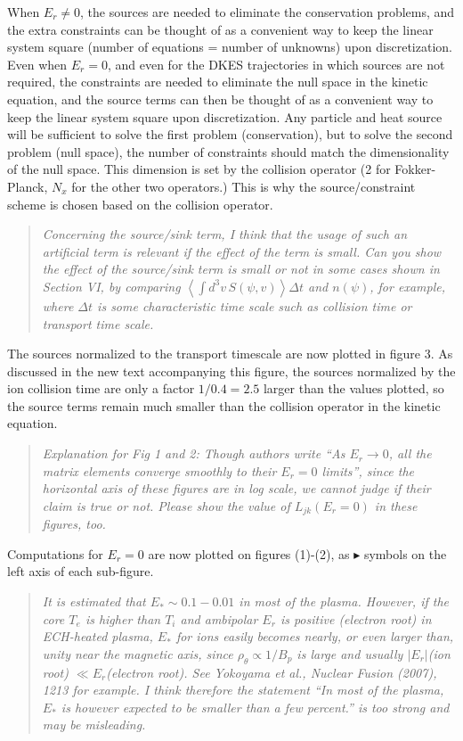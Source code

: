 \documentclass[11pt]{article}
\newenvironment{referee}{\begin{quote}\it\color{Blue}}{\end{quote}}
\begin{document}
When $E_r \ne 0$, the sources are needed to eliminate the conservation problems, and the extra constraints 
can be thought of as a convenient way to keep the linear system square (number of equations = number of unknowns) upon discretization.
Even when $E_r = 0$, and even for the DKES trajectories in which sources are not required, the constraints are needed to eliminate
the null space in the kinetic equation, and the source terms can then be thought of as
a convenient way to keep the linear system square upon discretization.
Any particle and heat source will be sufficient to solve the first problem (conservation), but to solve the second problem (null space),
the number of constraints should match the dimensionality of the null space.  This dimension is set by the collision operator (2 for
Fokker-Planck, $N_x$ for the other two operators.)
This is why the source/constraint scheme is chosen based on the collision operator.

\begin{referee}
Concerning the source/sink term, I think that the usage of such an artificial term is relevant if
the effect of the term is small. Can you show the effect of the source/sink term is small or not in
some cases shown in Section VI, by comparing $\left< \int d^3v\, S(\psi,v) \right> \Delta t$ and $n(\psi)$, for example, where
$\Delta t$ is some characteristic time scale such as collision time or transport time scale.
\end{referee}

The sources normalized to the transport timescale are now plotted in figure 3.
As discussed in the new text accompanying this figure, 
the sources normalized by the ion collision time are only a factor $1/0.4=2.5$ larger than the values plotted,
so the source terms remain much smaller than the collision operator in the kinetic equation.

\begin{referee}
Explanation for Fig 1 and 2: Though authors write ``As $E_r \to 0$, all the matrix elements converge
smoothly to their $E_r = 0$ limits'', since the horizontal axis of these figures are in log scale, we
cannot judge if their claim is true or not. Please show the value of $L_{jk}(E_r=0)$ in these figures,
too.
\end{referee}

Computations for $E_r=0$ are now plotted on figures (1)-(2), as $\blacktriangleright$ symbols on the left axis
of each sub-figure.

\begin{referee}
It is estimated that $E_* \sim 0.1 - 0.01$ in most of the plasma. However, if the core $T_e$ is higher than
$T_i$ and ambipolar $E_r$ is positive (electron root) in ECH-heated plasma, $E_*$ for ions easily becomes
nearly, or even larger than, unity near the magnetic axis, since $\rho_\theta \propto 1/B_p$ is large and usually
$|E_r|$(ion root) $\ll E_r$(electron root). See Yokoyama et al., Nuclear Fusion (2007), 1213 for example.
I think therefore the statement ``In most of the plasma, $E_*$ is however expected to be smaller
than a few percent.'' is too strong and may be misleading.
\end{referee}
\end{document}
